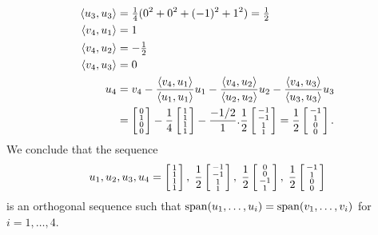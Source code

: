 \documentclass[a4paper]{article}
\begin{document}
\begin{solution}
\begin{itemize}
\begin{align*}
    \langle u_3,u_3\rangle &= \tfrac{1}{4}(0^2+0^2+(-1)^2+1^2) = \tfrac{1}{2}\\
    \langle v_4,u_1\rangle &= 1 \\
    \langle v_4,u_2\rangle &= -\tfrac{1}{2} \\
    \langle v_4,u_3\rangle &= 0 \\
    u_4 &= v_4 - \frac{\langle v_4,u_1\rangle}{\langle u_1,u_1\rangle}u_1 
               - \frac{\langle v_4,u_2\rangle}{\langle u_2,u_2\rangle}u_2 
               - \frac{\langle v_4,u_3\rangle}{\langle u_3,u_3\rangle}u_3  \\
        &= \left[\begin{smallmatrix} 0\\1\\0\\0\end{smallmatrix}\right] -
           \frac{1}{4}\left[\begin{smallmatrix} 1\\1\\1\\1 \end{smallmatrix}\right] - 
           \frac{-1/2}{1}.\frac{1}{2}\left[\begin{smallmatrix} -1\\-1\\1\\1\end{smallmatrix}\right]
         = \frac{1}{2} \left[\begin{smallmatrix} -1\\1\\0\\0\end{smallmatrix}\right]. 
   \end{align*}
   We conclude that the sequence
   \[ u_1,u_2,u_3,u_4 = 
     \left[\begin{smallmatrix} 1\\1\\1\\1\end{smallmatrix}\right], \; 
     \frac{1}{2}\left[\begin{smallmatrix} -1\\-1\\1\\1\end{smallmatrix}\right], \;
     \frac{1}{2}\left[\begin{smallmatrix} 0\\0\\-1\\1\end{smallmatrix}\right], \;
     \frac{1}{2} \left[\begin{smallmatrix} -1\\1\\0\\0\end{smallmatrix}\right]
   \]
   is an orthogonal sequence such that
   $\operatorname{span}(u_1,\dotsc,u_i)=\operatorname{span}(v_1,\dotsc,v_i)$ for
   $i=1,\dotsc,4$.
 \end{itemize}
\end{solution}
\end{document}
